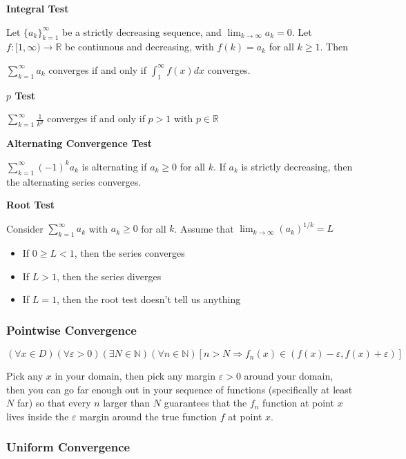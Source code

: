 \documentclass[12pt,letterpaper]{article}
\def\eps{\varepsilon{}}
\newcommand{\R}{{\mathbb R}}
\newcommand{\N}{{\mathbb N}}
\begin{document}
\begin{multicols*}{2}
        {\bf Integral Test}

        Let $\{a_k\}_{k = 1}^{\infty}$ be a strictly decreasing sequence, and
        $\lim_{k \to \infty} a_k = 0$. Let $f: [1, \infty) \to \R$ be contiunous
        and decreasing, with $f(k) = a_k$ for all $k \ge 1$. Then

        $\sum_{k = 1}^{\infty} a_k$ converges if and only if $\int_1^{\infty}
        f(x)dx$ converges.


        {\bf $p$ Test}

        $\sum_{k = 1}^{\infty} \frac{1}{k^p}$ converges if and only if $p > 1$
        with $p \in \R$

        {\bf Alternating Convergence Test}

        $\sum_{k = 1}^{\infty} (-1)^k a_k$ is alternating if $a_k \ge 0$ for all
        $k$. If $a_k$ is strictly decreasing, then the alternating series
        converges.


        {\bf Root Test}

        Consider $\sum_{k = 1}^{\infty} a_k$ with $a_k \ge 0$ for all $k$.
        Assume that $\lim_{k \to \infty} (a_k)^{1 / k} = L$

        \begin{itemize}
          \item If $0 \ge L < 1$, then the series converges
          \item If $L > 1$, then the series diverges
          \item If $L = 1$, then the root test doesn't tell us anything
        \end{itemize}


        \subsubsection{Pointwise Convergence}

        \[
            (\forall x \in D)(\forall \eps > 0)(\exists N \in \N)(\forall n \in \N)
            [n > N \Rightarrow f_n(x) \in (f(x) - \eps, f(x) + \eps)]
        \]

        Pick any $x$ in your domain, then pick any margin $\eps > 0$ around
        your domain, then you can go far enough out in your sequence of
        functions (specifically at least $N$ far) so that every $n$ larger than
        $N$ guarantees that the ${f_n}$ function at point $x$ lives inside the
        $\eps$ margin around the true function $f$ at point $x$.

        \subsubsection{Uniform Convergence}


\end{multicols*}
\end{document}
